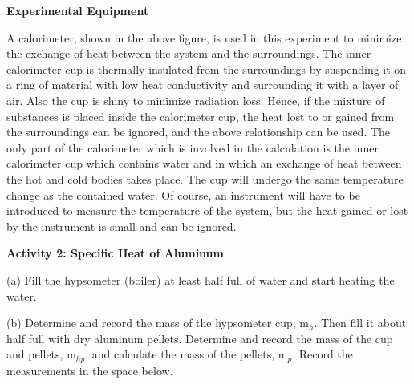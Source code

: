 \vspace{0.3cm}
{\centering {}  \par}
\vspace{0.3cm}

\textbf{Experimental Equipment} 

A calorimeter, shown in the above figure, is used in this experiment
to minimize the exchange of heat between the system and the surroundings.
The inner calorimeter cup is thermally insulated from the surroundings
by suspending it on a ring of material with low heat conductivity
and surrounding it with a layer of air. Also the cup is shiny to minimize
radiation loss. Hence, if the mixture of substances is placed inside
the calorimeter cup, the heat lost to or gained from the surroundings
can be ignored, and the above relationship can be used. The only part
of the calorimeter which is involved in the calculation is the inner
calorimeter cup which contains water and in which an exchange of heat
between the hot and cold bodies takes place. The cup will undergo
the same temperature change as the contained water. Of course, an
instrument will have to be introduced to measure the temperature of
the system, but the heat gained or lost by the instrument is small
and can be ignored.

\textbf{Activity 2: Specific Heat of Aluminum}

(a) Fill the hypsometer (boiler) at least half full of water and start
heating the water.

(b) Determine and record the mass of the hypsometer cup, m\( _{h} \).
Then fill it about half full with dry aluminum pellets. Determine
and record the mass of the cup and pellets, m\( _{hp} \), and calculate
the mass of the pellets, m\( _{p} \). Record the measurements in
the space below.
\vspace{10mm}

